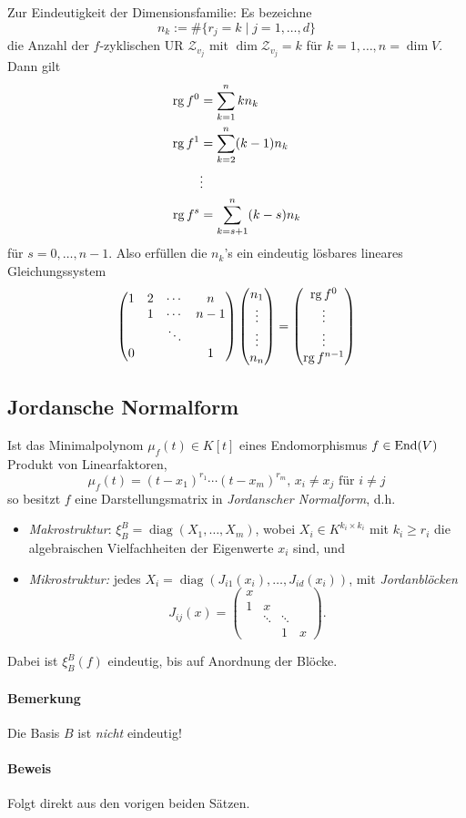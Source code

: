 	Zur Eindeutigkeit der Dimensionsfamilie: Es bezeichne
		\[ n_k := \#\{r_j = k\mid j = 1,\dots,d \} \]
	die Anzahl der $ f $-zyklischen UR $ \mathcal{Z}_{v_j} $ mit $ \dim \mathcal{Z}_{v_j} = k $ für $ k=1,\dots,n=\dim V $. Dann gilt
		\begin{align*}
		\operatorname{rg} f^0 &= \sum_{k=1}^{n}kn_k\\
		\operatorname{rg} f^1 &= \sum_{k=2}^{n}(k-1)n_k\\
		&\vdots\\
		\operatorname{rg} f^s &= \sum_{k=s+1}^{n}(k-s)n_k
		\end{align*}
	für $ s=0,\dots,n-1 $. Also erfüllen die $ n_k $'s ein eindeutig lösbares lineares Gleichungssystem 
		\[
		\begin{pmatrix}
		1 & 2 & \cdots & n \\ 
		& 1 & \cdots & n-1 \\ 
		&  & \ddots &  \\ 
		0 &  &  & 1
		\end{pmatrix} 
		\begin{pmatrix}
		n_1\\
		\vdots\\
		\vdots\\
		n_n
		\end{pmatrix} = \begin{pmatrix}
		\operatorname{rg} f^0\\
		\vdots\\
		\vdots\\
		\operatorname{rg} f^{n-1}
		\end{pmatrix} \]
\subsection{Jordansche Normalform}
\begin{Satz}
	Ist das Minimalpolynom $ \mu_f(t)\in K[t] $ eines Endomorphismus $ f\in \operatorname{End}(V) $ Produkt von Linearfaktoren,
		\[ \mu_f(t) = (t-x_1)^{r_1}\cdots(t-x_m)^{r_m},\, x_i\neq x_j \text{ für }i\neq j \]
	so besitzt $ f $ eine Darstellungsmatrix in \emph{Jordanscher Normalform}, d.h.
		\begin{itemize}
			\item \emph{Makrostruktur}: $ \xi_B^B = \operatorname{diag}(X_1,\dots,X_m) $, wobei $ X_i \in K^{k_i\times k_i} $ mit $ k_i\geq r_i $ die algebraischen Vielfachheiten der Eigenwerte $ x_i $ sind, und
			\item \emph{Mikrostruktur:} jedes $ X_i = \operatorname{diag}(J_{i1}(x_i),\dots,J_{id}(x_i)) $, mit \emph{Jordanblöcken}
				\[ J_{ij}(x) = \begin{pmatrix}
				x &  &  &  \\ 
				1 & x &  &  \\ 
				& \ddots & \ddots &  \\ 
				&  & 1 & x
				\end{pmatrix}.  \]
		\end{itemize}
	Dabei ist $ \xi_B^B(f) $ eindeutig, bis auf Anordnung der Blöcke.
\end{Satz}
\paragraph{Bemerkung}
	Die Basis $ B $ ist \emph{nicht} eindeutig!
\paragraph{Beweis}
	Folgt direkt aus den vorigen beiden Sätzen.
